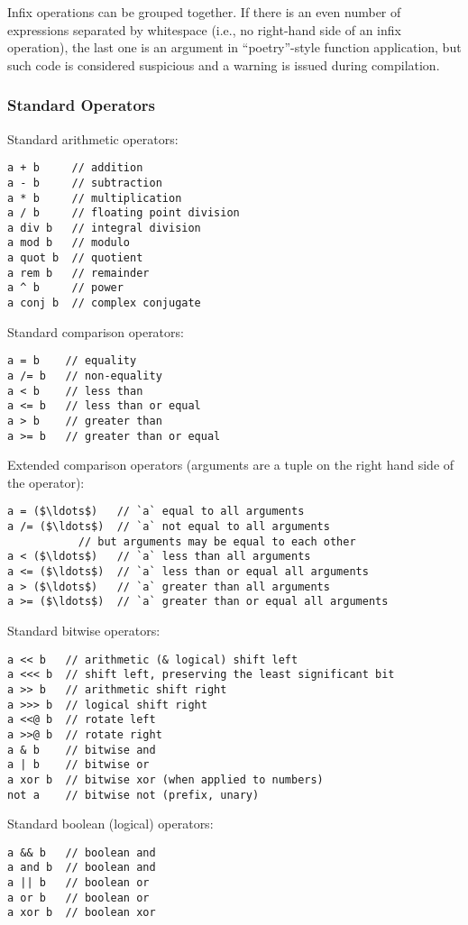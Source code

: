 Infix operations can be grouped together. If there is an even number of expressions separated by whitespace (i.e., no right-hand side of an infix operation), the last one is an argument in ``poetry''-style function application, but such code is considered suspicious and a warning is issued during compilation. 




\subsubsection{Standard Operators}

Standard arithmetic operators:
\begin{lstlisting}
a + b     // addition
a - b     // subtraction
a * b     // multiplication
a / b     // floating point division
a div b   // integral division
a mod b   // modulo
a quot b  // quotient
a rem b   // remainder
a ^ b     // power
a conj b  // complex conjugate
\end{lstlisting}

Standard comparison operators:
\begin{lstlisting}
a = b    // equality
a /= b   // non-equality
a < b    // less than
a <= b   // less than or equal
a > b    // greater than
a >= b   // greater than or equal
\end{lstlisting}

Extended comparison operators (arguments are a tuple on the right hand side of the operator):
\begin{lstlisting}
a = ($\ldots$)   // `a` equal to all arguments
a /= ($\ldots$)  // `a` not equal to all arguments
           // but arguments may be equal to each other
a < ($\ldots$)   // `a` less than all arguments
a <= ($\ldots$)  // `a` less than or equal all arguments
a > ($\ldots$)   // `a` greater than all arguments
a >= ($\ldots$)  // `a` greater than or equal all arguments
\end{lstlisting}

Standard bitwise operators: 
\begin{lstlisting}
a << b   // arithmetic (& logical) shift left
a <<< b  // shift left, preserving the least significant bit
a >> b   // arithmetic shift right
a >>> b  // logical shift right
a <<@ b  // rotate left
a >>@ b  // rotate right
a & b    // bitwise and
a | b    // bitwise or
a xor b  // bitwise xor (when applied to numbers)
not a    // bitwise not (prefix, unary)
\end{lstlisting}

Standard boolean (logical) operators:
\begin{lstlisting}
a && b   // boolean and
a and b  // boolean and
a || b   // boolean or
a or b   // boolean or
a xor b  // boolean xor
\end{lstlisting}

